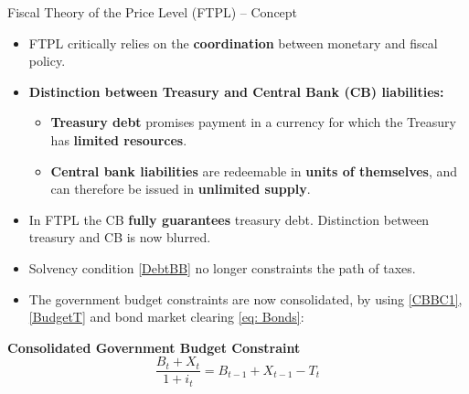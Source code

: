\documentclass[11pt,aspectratio=169]{beamer}
\begin{document}
\begin{frame}{Fiscal Theory of the Price Level (FTPL) – Concept}
\begin{itemize}
    \item FTPL critically relies on the \textbf{coordination} between monetary and fiscal policy.

    \item \textbf{Distinction between Treasury and Central Bank (CB) liabilities:}
  \begin{itemize}
    \item \textbf{Treasury debt} promises payment in a currency for which the Treasury has \textbf{limited resources}.
    \item \textbf{Central bank liabilities} are redeemable in \textbf{units of themselves}, and can therefore be issued in \textbf{unlimited supply}.
  \end{itemize}
    \vspace{0.15cm}    
    \item In FTPL the CB \textbf{fully guarantees} treasury debt. Distinction between treasury and CB is now blurred.
    \item Solvency condition \eqref{DebtBB} no longer constraints the path of taxes.
    \vspace{0.15cm}
    \item The government budget constraints are now consolidated, by using \eqref{CBBC1}, \eqref{BudgetT} and bond market clearing \eqref{eq: Bonds}:
    \end{itemize}
\textbf{Consolidated Government Budget Constraint}
    \begin{equation} \label{eq: gov_budget}
        \frac{B_t + X_t}{1+i_t} = B_{t-1} + X_{t-1} - T_t
    \end{equation}
\end{frame}
\end{document}
